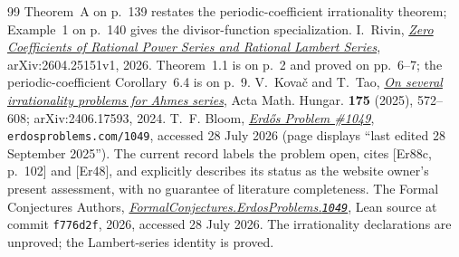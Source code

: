 \begin{thebibliography}{99}
  Theorem~A on p.~139 restates the periodic-coefficient irrationality theorem;
  Example~1 on p.~140 gives the divisor-function specialization.
 I.~Rivin,
\href{https://arxiv.org/abs/2604.25151}{\emph{Zero Coefficients of Rational
  Power Series and Rational Lambert Series}}, arXiv:2604.25151v1, 2026.
  Theorem~1.1 is on p.~2 and proved on pp.~6--7; the periodic-coefficient
  Corollary~6.4 is on p.~9.
 V.~Kova\v{c} and T.~Tao,
  \href{https://arxiv.org/abs/2406.17593}{\emph{On several irrationality
  problems for Ahmes series}}, Acta Math. Hungar. \textbf{175} (2025),
  572--608; arXiv:2406.17593, 2024.
 T.~F. Bloom,
  \href{https://www.erdosproblems.com/1049}{\emph{Erd\H{o}s Problem \#1049}},
  \texttt{erdosproblems.com/1049}, accessed 28 July 2026
  (page displays ``last edited 28 September 2025'').  The current record
  labels the problem open, cites \textup{[Er88c, p.~102]} and \textup{[Er48]},
  and explicitly describes its status as the website owner's present
  assessment, with no guarantee of literature completeness.
 The Formal Conjectures Authors,
  \href{https://github.com/google-deepmind/formal-conjectures/blob/f776d2f2039351b00737ffcafb9d7d7666e1d9af/FormalConjectures/ErdosProblems/1049.lean}
  {\emph{FormalConjectures.ErdosProblems.\texttt{1049}}},
  Lean source at commit \texttt{f776d2f}, 2026, accessed 28 July 2026.  The
  irrationality declarations are unproved; the Lambert-series identity is
  proved.
\end{thebibliography}


